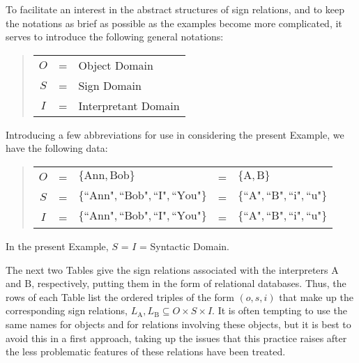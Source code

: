\documentclass[12pt]{article}
\begin{document}
To facilitate an interest in the abstract structures of sign relations, and to keep the notations as brief as possible as the examples become more complicated, it serves to introduce the following general notations:

\begin{quote}\begin{tabular}{cll}
$O$ & = & Object Domain       \\
$S$ & = & Sign Domain         \\
$I$ & = & Interpretant Domain \\
\end{tabular}\end{quote}

Introducing a few abbreviations for use in considering the present Example, we have the following data:

\begin{quote}\begin{tabular}{cllll}
$O$ & = & $\{ \mathrm{Ann}, \mathrm{Bob} \}$
    & = & $\{ \mathrm{A},   \mathrm{B}   \}$ \\
$S$ & = & $\{ \text{``Ann"}, \text{``Bob"}, \text{``I"}, \text{``You"} \}$
    & = & $\{ \text{``A"},   \text{``B"},   \text{``i"}, \text{``u"}   \}$ \\
$I$ & = & $\{ \text{``Ann"}, \text{``Bob"}, \text{``I"}, \text{``You"} \}$
    & = & $\{ \text{``A"},   \text{``B"},   \text{``i"}, \text{``u"}   \}$ \\
\end{tabular}\end{quote}

In the present Example, $S$ = $I$ = Syntactic Domain.

The next two Tables give the sign relations associated with the interpreters $\mathrm{A}$ and $\mathrm{B}$, respectively, putting them in the form of relational databases.  Thus, the rows of each Table list the ordered triples of the form $(o, s, i)$ that make up the corresponding sign relations, $L_{\mathrm{A}}, L_{\mathrm{B}} \subseteq O \times S \times I$.  It is often tempting to use the same names for objects and for relations involving these objects, but it is best to avoid this in a first approach, taking up the issues that this practice raises after the less problematic features of these relations have been treated.
\end{document}

